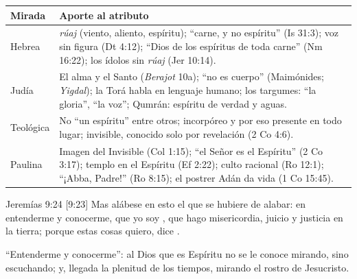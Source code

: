 \begin{center}\small\renewcommand{\arraystretch}{1.3}
\begin{tabular}{@{}L{3.0cm}L{11.4cm}@{}}
\toprule
\textbf{Mirada} & \textbf{Aporte al atributo} \\ \midrule
Hebrea & \emph{rúaj} (viento, aliento, espíritu); ``carne, y no espíritu'' (Is 31:3); voz sin figura (Dt 4:12); ``Dios de los espíritus de toda carne'' (Nm 16:22); los ídolos sin \emph{rúaj} (Jer 10:14). \\
Judía & El alma y el Santo (\emph{Berajot} 10a); ``no es cuerpo'' (Maimónides; \emph{Yigdal}); la Torá habla en lenguaje humano; los targumes: ``la gloria'', ``la voz''; Qumrán: espíritu de verdad y aguas. \\
Teológica & No ``un espíritu'' entre otros; incorpóreo y por eso presente en todo lugar; invisible, conocido solo por revelación (2 Co 4:6). \\
Paulina & Imagen del Invisible (Col 1:15); ``el Señor es el Espíritu'' (2 Co 3:17); templo en el Espíritu (Ef 2:22); culto racional (Ro 12:1); ``¡Abba, Padre!'' (Ro 8:15); el postrer Adán da vida (1 Co 15:45). \\
\bottomrule
\end{tabular}\end{center}

\begin{verso}{Jeremías 9:24 [9:23]}
Mas alábese en esto el que se hubiere de alabar: en entenderme y conocerme, que yo soy \SENOR{}, que hago misericordia, juicio y justicia en la tierra; porque estas cosas quiero, dice \SENOR{}.
\end{verso}

``Entenderme y conocerme'': al Dios que es Espíritu no se le conoce mirando, sino escuchando; y, llegada la plenitud de los tiempos, mirando el rostro de Jesucristo.

